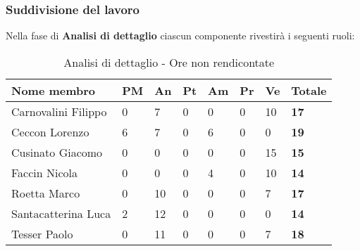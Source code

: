 		\subsubsection{Suddivisione del lavoro} %
		\label{ssub:suddivisione_del_lavoro}
		Nella fase di \textbf{Analisi di dettaglio} ciascun componente rivestirà i seguenti ruoli: \\
			\begin{table}[!h]
				\begin{center}
					\begin{tabularx}{0.9\textwidth}{|l|l|l|l|l|l|l|X|}
						\hline
						\textbf{Nome membro} & \textbf{PM} & \textbf{An} & \textbf{Pt} & \textbf{Am} & \textbf{Pr} & \textbf{Ve} & \textbf{Totale} \\
						\hline
						Carnovalini Filippo & 0 & 7 & 0 & 0 & 0 & 10 & \textbf{17} \\
						\hline
						Ceccon Lorenzo & 6 & 7 & 0 & 6 & 0 & 0 & \textbf{19} \\
						\hline
						Cusinato Giacomo & 0 & 0 & 0 & 0 & 0 & 15 & \textbf{15} \\
						\hline
						Faccin Nicola & 0 & 0 & 0 & 4 & 0 & 10 & \textbf{14} \\
						\hline
						Roetta Marco & 0 & 10 & 0 & 0 & 0 & 7 & \textbf{17} \\
						\hline
						Santacatterina Luca & 2 & 12 & 0 & 0 & 0 & 0 & \textbf{14} \\
						\hline
						Tesser Paolo & 0 & 11 & 0 & 0 & 0 & 7 & \textbf{18} \\
						\hline	
					\end{tabularx}
				\end{center}
			\caption{Analisi di dettaglio - Ore non rendicontate}
			\end{table}
		
